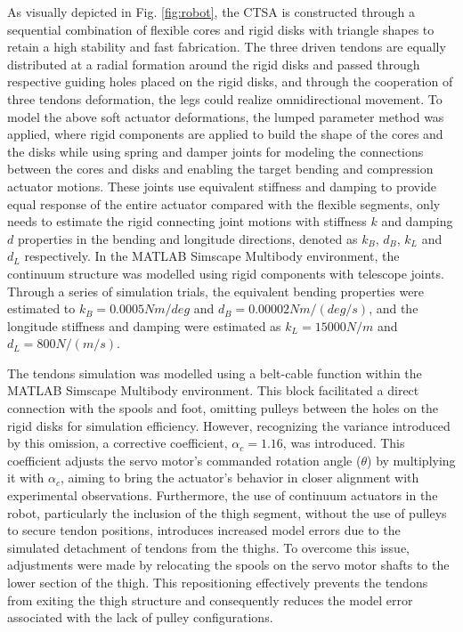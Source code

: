 As visually depicted in Fig. \ref{fig:robot}, the \ac{CTSA} is constructed through a sequential combination of flexible cores and rigid disks with triangle shapes to retain a high stability and fast fabrication. The three driven tendons are equally distributed at a radial formation around the rigid disks and passed through respective guiding holes placed on the rigid disks, and through the cooperation of three tendons deformation, the legs could realize omnidirectional movement. To model the above soft actuator deformations, the lumped parameter method was applied, where rigid components are applied to build the shape of the cores and the disks while using spring and damper joints for modeling the connections between the cores and disks and enabling the target bending and compression actuator motions. These joints use equivalent stiffness and damping to provide equal response of the entire actuator compared with the flexible segments, only needs to estimate the rigid connecting joint motions with stiffness $k$ and damping $d$ properties in the bending and longitude directions, denoted as $k_B$, $d_B$, $k_L$ and $d_L$ respectively. In the MATLAB Simscape Multibody environment, the continuum structure was modelled using rigid components with telescope joints. Through a series of simulation trials, the equivalent bending properties were estimated to $k_B = 0.0005 N m/deg$ and $d_B = 0.00002 N m/(deg/s)$, and the longitude stiffness and damping were estimated as $k_L = 15000 N/m$ and $d_L = 800 N/(m/s)$.

The tendons simulation was modelled using a belt-cable function within the MATLAB Simscape Multibody environment. This block facilitated a direct connection with the spools and foot, omitting pulleys between the holes on the rigid disks for simulation efficiency. However, recognizing the variance introduced by this omission, a corrective coefficient, $\alpha_c = 1.16$, was introduced. This coefficient adjusts the servo motor's commanded rotation angle ($\theta$) by multiplying it with $\alpha_c$, aiming to bring the actuator's behavior in closer alignment with experimental observations. Furthermore, the use of continuum actuators in the robot, particularly the inclusion of the thigh segment, without the use of pulleys to secure tendon positions, introduces increased model errors due to the simulated detachment of tendons from the thighs. To overcome this issue, adjustments were made by relocating the spools on the servo motor shafts to the lower section of the thigh. This repositioning effectively prevents the tendons from exiting the thigh structure and consequently reduces the model error associated with the lack of pulley configurations. 

